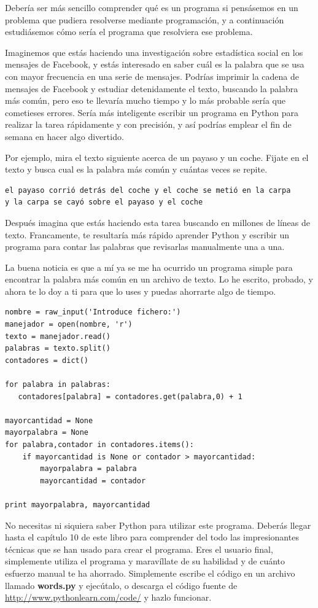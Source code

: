 Debería ser más sencillo comprender qué es un programa si pensásemos en un problema
que pudiera resolverse mediante programación, y a continuación estudiásemos cómo sería el
programa que resolviera ese problema.

Imaginemos que estás haciendo una investigación sobre estadística social en los mensajes
de Facebook, y estás interesado en saber cuál es la palabra que se usa con mayor frecuencia
en una serie de mensajes. Podrías imprimir la cadena de mensajes de Facebook y estudiar
detenidamente el texto, buscando la palabra más común, pero eso te llevaría mucho tiempo
y lo más probable sería que cometieses errores. Sería más inteligente escribir un programa
en Python para realizar la tarea rápidamente y con precisión, y así podrías emplear el fin
de semana en hacer algo divertido.

Por ejemplo, mira el texto siguiente acerca de un payaso y un coche. Fijate en el
texto y busca cual es la palabra más común y cuántas veces se repite.

\beforeverb
\begin{verbatim}
el payaso corrió detrás del coche y el coche se metió en la carpa
y la carpa se cayó sobre el payaso y el coche
\end{verbatim}
\afterverb
%
Después imagina que estás haciendo esta tarea buscando en millones de líneas de
texto. Francamente, te resultaría más rápido aprender Python y escribir un
programa para contar las palabras que revisarlas manualmente una a una.

La buena noticia es que a mí ya se me ha ocurrido un programa
simple para encontrar la palabra más común en un archivo de texto. Lo he escrito,
probado, y ahora te lo doy a ti para que lo uses y puedas ahorrarte algo de tiempo.

\beforeverb
\begin{verbatim}
nombre = raw_input('Introduce fichero:')
manejador = open(nombre, 'r')
texto = manejador.read()
palabras = texto.split()
contadores = dict()

for palabra in palabras:
   contadores[palabra] = contadores.get(palabra,0) + 1

mayorcantidad = None
mayorpalabra = None
for palabra,contador in contadores.items():
    if mayorcantidad is None or contador > mayorcantidad:
        mayorpalabra = palabra
        mayorcantidad = contador

print mayorpalabra, mayorcantidad
\end{verbatim}
\afterverb
%
No necesitas ni siquiera saber Python para utilizar este programa. Deberás llegar hasta
el capítulo 10 de este libro para comprender del todo las impresionantes técnicas que
se han usado para crear el programa. Eres el usuario final, simplemente utiliza el
programa y maravíllate de su habilidad y de cuánto esfuerzo manual te ha ahorrado.
Simplemente escribe el código
en un archivo llamado {\bf words.py} y ejecútalo, o descarga el código fuente
de \url{http://www.pythonlearn.com/code/} y hazlo funcionar.

